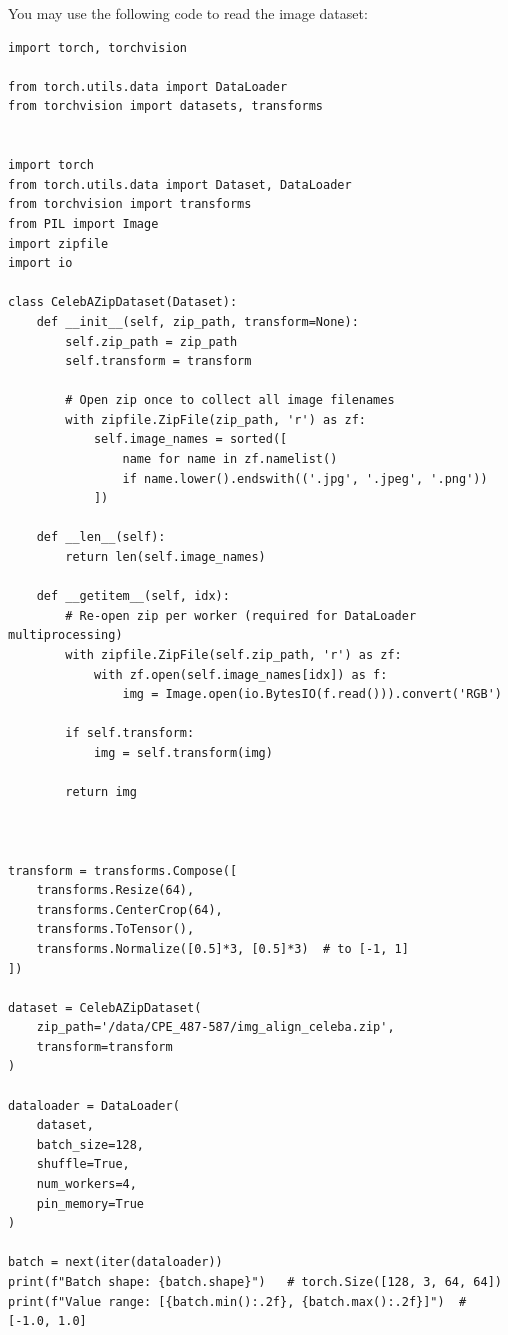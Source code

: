 \documentclass[12pt, xcolor=dvipsnames,svgnames,x11names]{article}
\theoremstyle{definition}
\begin{document}
You may use the following code to read the image dataset:

\begin{verbatim}
import torch, torchvision

from torch.utils.data import DataLoader
from torchvision import datasets, transforms


import torch
from torch.utils.data import Dataset, DataLoader
from torchvision import transforms
from PIL import Image
import zipfile
import io

class CelebAZipDataset(Dataset):
    def __init__(self, zip_path, transform=None):
        self.zip_path = zip_path
        self.transform = transform

        # Open zip once to collect all image filenames
        with zipfile.ZipFile(zip_path, 'r') as zf:
            self.image_names = sorted([
                name for name in zf.namelist()
                if name.lower().endswith(('.jpg', '.jpeg', '.png'))
            ])

    def __len__(self):
        return len(self.image_names)

    def __getitem__(self, idx):
        # Re-open zip per worker (required for DataLoader multiprocessing)
        with zipfile.ZipFile(self.zip_path, 'r') as zf:
            with zf.open(self.image_names[idx]) as f:
                img = Image.open(io.BytesIO(f.read())).convert('RGB')

        if self.transform:
            img = self.transform(img)

        return img



transform = transforms.Compose([
    transforms.Resize(64),
    transforms.CenterCrop(64),
    transforms.ToTensor(),
    transforms.Normalize([0.5]*3, [0.5]*3)  # to [-1, 1]
])

dataset = CelebAZipDataset(
    zip_path='/data/CPE_487-587/img_align_celeba.zip',
    transform=transform
)

dataloader = DataLoader(
    dataset,
    batch_size=128,
    shuffle=True,
    num_workers=4,
    pin_memory=True
)

batch = next(iter(dataloader))
print(f"Batch shape: {batch.shape}")   # torch.Size([128, 3, 64, 64])
print(f"Value range: [{batch.min():.2f}, {batch.max():.2f}]")  # [-1.0, 1.0]

\end{verbatim}
\end{document}
